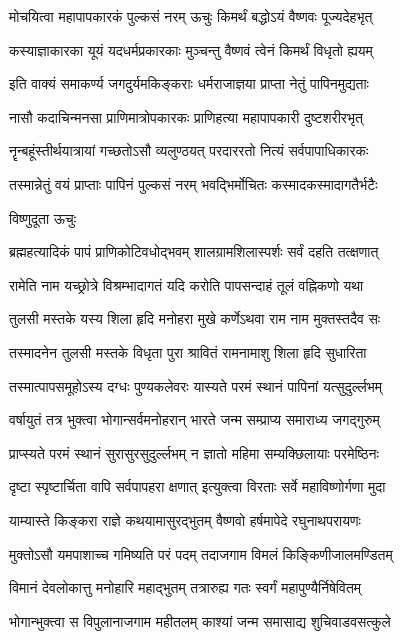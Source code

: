 \twolineshloka
{मोचयित्वा महापापकारकं पुल्कसं नरम्}
{ऊचुः किमर्थं बद्धोऽयं वैष्णवः पूज्यदेहभृत्}%

\twolineshloka
{कस्याज्ञाकारका यूयं यदधर्मप्रकारकाः}
{मुञ्चन्तु वैष्णवं त्वेनं किमर्थं विधृतो ह्ययम्}%

\twolineshloka
{इति वाक्यं समाकर्ण्य जगदुर्यमकिङ्कराः}
{धर्मराजाज्ञया प्राप्ता नेतुं पापिनमुद्यताः}%

\twolineshloka
{नासौ कदाचिन्मनसा प्राणिमात्रोपकारकः}
{प्राणिहत्या महापापकारी दुष्टशरीरभृत्}%

\twolineshloka
{नॄन्बहूंस्तीर्थयात्रायां गच्छतोऽसौ व्यलुण्ठयत्}
{परदाररतो नित्यं सर्वपापाधिकारकः}%

\twolineshloka
{तस्मान्नेतुं वयं प्राप्ताः पापिनं पुल्कसं नरम्}
{भवद्भिर्मोचितः कस्मादकस्मादागतैर्भटैः}%

विष्णुदूता ऊचुः

\twolineshloka
{ब्रह्महत्यादिकं पापं प्राणिकोटिवधोद्भवम्}
{शालग्रामशिलास्पर्शः सर्वं दहति तत्क्षणात्}%

\twolineshloka
{रामेति नाम यच्छ्रोत्रे विश्रम्भादागतं यदि}
{करोति पापसन्दाहं तूलं वह्निकणो यथा}%

\twolineshloka
{तुलसी मस्तके यस्य शिला हृदि मनोहरा}
{मुखे कर्णेऽथवा राम नाम मुक्तस्तदैव सः}%

\twolineshloka
{तस्मादनेन तुलसी मस्तके विधृता पुरा}
{श्रावितं रामनामाशु शिला हृदि सुधारिता}%

\twolineshloka
{तस्मात्पापसमूहोऽस्य दग्धः पुण्यकलेवरः}
{यास्यते परमं स्थानं पापिनां यत्सुदुर्ल्लभम्}%

\twolineshloka
{वर्षायुतं तत्र भुक्त्वा भोगान्सर्वमनोहरान्}
{भारते जन्म सम्प्राप्य समाराध्य जगद्गुरुम्}%

\twolineshloka
{प्राप्स्यते परमं स्थानं सुरासुरसुदुर्ल्लभम्}
{न ज्ञातो महिमा सम्यक्छिलायाः परमेष्ठिनः}%

\twolineshloka
{दृष्टा स्पृष्टार्चिता वापि सर्वपापहरा क्षणात्}
{इत्युक्त्वा विरताः सर्वे महाविष्णोर्गणा मुदा}%

\twolineshloka
{याम्यास्ते किङ्करा राज्ञे कथयामासुरद्भुतम्}
{वैष्णवो हर्षमापेदे रघुनाथपरायणः}%

\twolineshloka
{मुक्तोऽसौ यमपाशाच्च गमिष्यति परं पदम्}
{तदाजगाम विमलं किङ्किणीजालमण्डितम्}%

\twolineshloka
{विमानं देवलोकात्तु मनोहारि महाद्भुतम्}
{तत्रारुह्य गतः स्वर्गं महापुण्यैर्निषेवितम्}%

\twolineshloka
{भोगान्भुक्त्वा स विपुलानाजगाम महीतलम्}
{काश्यां जन्म समासाद्य शुचिवाडवसत्कुले}%

